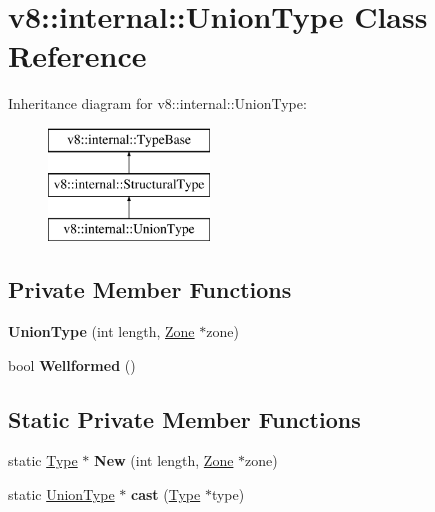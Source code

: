 \hypertarget{classv8_1_1internal_1_1_union_type}{}\section{v8\+:\+:internal\+:\+:Union\+Type Class Reference}
\label{classv8_1_1internal_1_1_union_type}
Inheritance diagram for v8\+:\+:internal\+:\+:Union\+Type\+:\begin{figure}[H]
\begin{center}
\leavevmode
\includegraphics[height=3.000000cm]{classv8_1_1internal_1_1_union_type}
\end{center}
\end{figure}
\subsection*{Private Member Functions}
\begin{DoxyCompactItemize}
\item 
{\bfseries Union\+Type} (int length, \hyperlink{classv8_1_1internal_1_1_zone}{Zone} $\ast$zone)\hypertarget{classv8_1_1internal_1_1_union_type_ab9676c857fbf432a95724e03c4b3bed6}{}\label{classv8_1_1internal_1_1_union_type_ab9676c857fbf432a95724e03c4b3bed6}

\item 
bool {\bfseries Wellformed} ()\hypertarget{classv8_1_1internal_1_1_union_type_a49163d276a7d26e82bd740dbb33ee241}{}\label{classv8_1_1internal_1_1_union_type_a49163d276a7d26e82bd740dbb33ee241}

\end{DoxyCompactItemize}
\subsection*{Static Private Member Functions}
\begin{DoxyCompactItemize}
\item 
static \hyperlink{classv8_1_1internal_1_1_type}{Type} $\ast$ {\bfseries New} (int length, \hyperlink{classv8_1_1internal_1_1_zone}{Zone} $\ast$zone)\hypertarget{classv8_1_1internal_1_1_union_type_a75af168e0255b4d182fed30d274075f7}{}\label{classv8_1_1internal_1_1_union_type_a75af168e0255b4d182fed30d274075f7}

\item 
static \hyperlink{classv8_1_1internal_1_1_union_type}{Union\+Type} $\ast$ {\bfseries cast} (\hyperlink{classv8_1_1internal_1_1_type}{Type} $\ast$type)\hypertarget{classv8_1_1internal_1_1_union_type_af1d508d213b30959fb283296bb8c757e}{}\label{classv8_1_1internal_1_1_union_type_af1d508d213b30959fb283296bb8c757e}

\end{DoxyCompactItemize}
